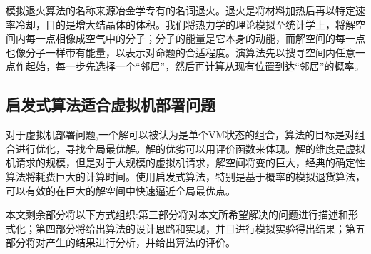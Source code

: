 模拟退火算法的名称来源冶金学专有的名词退火。退火是将材料加热后再以特定速率冷却，目的是增大结晶体的体积。我们将热力学的理论模拟至统计学上，将解空间内每一点相像成空气中的分子；分子的能量是它本身的动能，而解空间的每一点也像分子一样带有能量，以表示对命题的合适程度。演算法先以搜寻空间内任意一点作起始，每一步先选择一个``邻居''，然后再计算从现有位置到达``邻居''的概率。

\subsection*{启发式算法适合虚拟机部署问题}
\label{sec:advantage-of-sa}

对于虚拟机部署问题,一个解可以被认为是单个VM状态的组合，算法的目标是对组合进行优化，寻找全局最优解。解的优劣可以用评价函数来体现。解的维度是虚拟机请求的规模，但是对于大规模的虚拟机请求，解空间将变的巨大，经典的确定性算法将耗费巨大的计算时间。使用启发式算法，特别是基于概率的模拟退货算法，可以有效的在巨大的解空间中快速逼近全局最优点。

本文剩余部分将以下方式组织:第三部分将对本文所希望解决的问题进行描述和形式化；第四部分将给出算法的设计思路和实现，并且进行模拟实验得出结果；第五部分将对产生的结果进行分析，并给出算法的评价。







